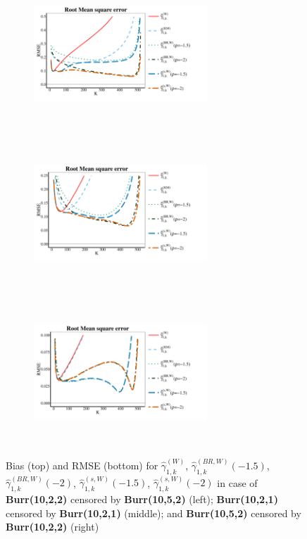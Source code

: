 \begin{landscape}
\begin{figure}[h]
\begin{subfigure}[h]{0.3\linewidth}
		\includegraphics[width=6.5cm,height=5.5cm]{./plots/paper2/zoomRMSE_simulations_B12_W.pdf}
	\end{subfigure}
	\hspace{\fill}
	\begin{subfigure}[h]{0.3\linewidth}
		\includegraphics[width=6.5cm,height=5.5cm]{./plots/paper2/zoomRMSE_simulations_B11_W.pdf}
	\end{subfigure}
	\hspace{\fill}
	\begin{subfigure}[h]{0.3\linewidth}
		\includegraphics[width=6.5cm,height=5.5cm]{./plots/paper2/zoomRMSE_simulations_B21_W.pdf}
	\end{subfigure}
	\caption{Bias (top) and RMSE (bottom) for $\hat{\gamma}_{1,k}^{(W)}$, $\hat{\gamma}_{1,k}^{(BR,W)}(-1.5)$, $\hat{\gamma}_{1,k}^{(BR,W)}(-2)$, $\hat{\gamma}_{1,k}^{(s,W)}(-1.5)$, $\hat{\gamma}_{1,k}^{(s,W)}(-2)$ in case of \textbf{Burr(10,2,2)} censored by \textbf{Burr(10,5,2)} (left); \textbf{Burr(10,2,1)} censored by \textbf{Burr(10,2,1)} (middle); and \textbf{Burr(10,5,2)} censored by \textbf{Burr(10,2,2)} (right) }
\label{paper2:fig5}
\end{figure}



\end{landscape}
